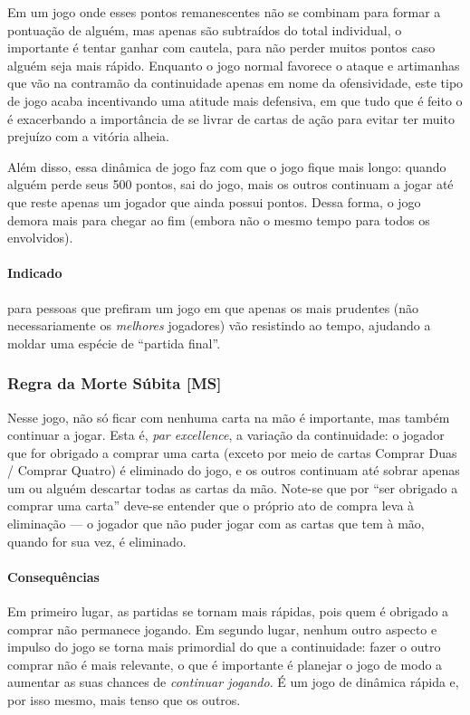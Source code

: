 Em um jogo onde esses pontos remanescentes não se combinam para formar a pontuação de alguém, mas apenas são subtraídos do total individual, o importante é tentar ganhar com cautela, para não perder muitos pontos caso alguém seja mais rápido. Enquanto o jogo normal favorece o ataque e artimanhas que vão na contramão da continuidade apenas em nome da ofensividade, este tipo de jogo acaba incentivando uma atitude mais defensiva, em que tudo que é feito o é exacerbando a importância de se livrar de cartas de ação para evitar ter muito prejuízo com a vitória alheia.

Além disso, essa dinâmica de jogo faz com que o jogo fique mais longo: quando alguém perde seus 500 pontos, sai do jogo, mais os outros continuam a jogar até que reste apenas um jogador que ainda possui pontos. Dessa forma, o jogo demora mais para chegar ao fim (embora não o mesmo tempo para todos os envolvidos).

\paragraph{Indicado}

para pessoas que prefiram um jogo em que apenas os mais prudentes (não necessariamente os \emph{melhores} jogadores) vão resistindo ao tempo, ajudando a moldar uma espécie de ``partida final''.

\subsubsection{Regra da Morte Súbita [MS]}

Nesse jogo, não só ficar com nenhuma carta na mão é importante, mas também continuar a jogar. Esta é, \emph{par excellence}, a variação da continuidade: o jogador que for obrigado a comprar uma carta (exceto por meio de cartas Comprar Duas / Comprar Quatro) é eliminado do jogo, e os outros continuam até sobrar apenas um ou alguém descartar todas as cartas da mão. Note-se que por ``ser obrigado a comprar uma carta'' deve-se entender que o próprio ato de compra leva à eliminação --- o jogador que não puder jogar com as cartas que tem à mão, quando for sua vez, é eliminado.

\paragraph{Consequências}

Em primeiro lugar, as partidas se tornam mais rápidas, pois quem é obrigado a comprar não permanece jogando. Em segundo lugar, nenhum outro aspecto e impulso do jogo se torna mais primordial do que a continuidade: fazer o outro comprar não é mais relevante, o que é importante é planejar o jogo de modo a aumentar as suas chances de \emph{continuar jogando}. É um jogo de dinâmica rápida e, por isso mesmo, mais tenso que os outros.

